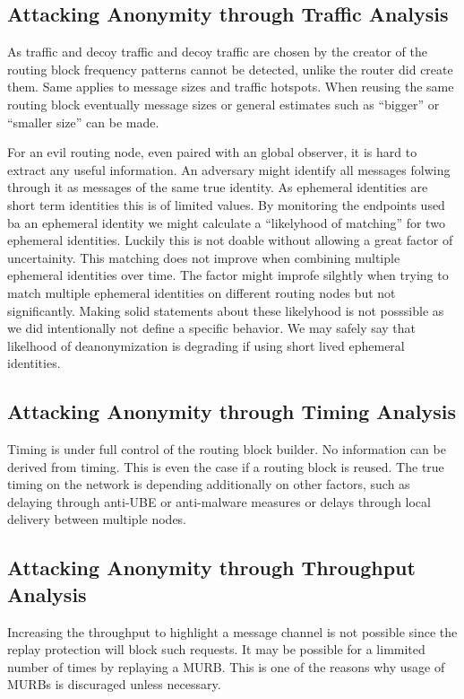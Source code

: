 \subsection{Attacking Anonymity through Traffic Analysis}
As traffic and decoy traffic and decoy traffic are chosen by the creator of the routing block frequency patterns cannot be detected, unlike the router did create them. Same applies to message sizes and traffic hotspots. When reusing the same routing block eventually message sizes or general estimates such as ``bigger'' or ``smaller size'' can be made.

For an evil routing node, even paired with an global observer, it is hard to extract any useful information. An adversary might identify all messages folwing through it as messages of the same true identity. As ephemeral identities are short term identities this is of limited values. By monitoring the endpoints used ba an ephemeral identity we might calculate a ``likelyhood of matching'' for two ephemeral identities. Luckily this is not doable without allowing a great factor of uncertainity. This matching does not improve when combining multiple ephemeral identities over time. The factor might improfe silghtly when trying to match multiple ephemeral identities on different routing nodes but not significantly. Making solid statements about these likelyhood is not posssible as we did intentionally not define a specific behavior. We may safely say that likelhood of deanonymization is degrading if using short lived ephemeral identities.

\subsection{Attacking Anonymity through Timing Analysis}
Timing is under full control of the routing block builder. No information can be derived from timing. This is even the case if a routing block is reused. The true timing on the network is depending additionally on other factors, such as delaying through anti-UBE or anti-malware measures or delays through local delivery between multiple nodes.

\subsection{Attacking Anonymity through Throughput Analysis}
Increasing the throughput to highlight a message channel is not possible since the replay protection will block such requests. It may be possible for a limmited number of times by replaying a MURB. This is one of the reasons why usage of MURBs is discuraged unless necessary.

